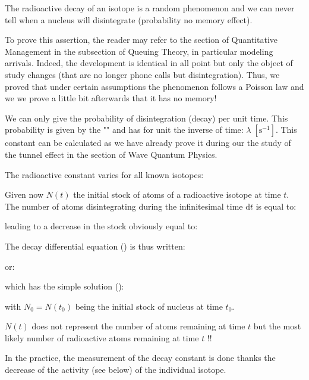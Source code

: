 	The radioactive decay of an isotope is a random phenomenon and we can never tell when a nucleus will disintegrate (probability no memory effect).
	
	\begin{tcolorbox}[title=Remark,colframe=black,arc=10pt]
	To prove this assertion, the reader may refer to the section of Quantitative Management in the subsection of Queuing Theory, in particular modeling arrivals. Indeed, the development is identical in all point but only the object of study changes (that are no longer phone calls but disintegration). Thus, we proved that under certain assumptions the phenomenon follows a Poisson law and we we prove a little bit afterwards that it has no memory!
	\end{tcolorbox}
	We can only give the probability of disintegration (decay) per unit time. This probability is given by the "" and has for unit the inverse of time: $\lambda\; [\text{s}^{-1}]$. This constant can be calculated as we have already prove it during our the study of the tunnel effect in the section of Wave Quantum Physics.

	The radioactive constant varies for all known isotopes:
	
	Given now $N (t)$ the initial stock of atoms of a radioactive isotope at time $t$. The number of atoms disintegrating during the infinitesimal time $\mathrm{d}t$ is equal to:
	
	leading to a decrease in the stock obviously equal to:
	
	The decay differential equation () is thus written:
	
	or:
	
	which has the simple solution ():
	
	with $N_0=N(t_0)$ being the initial stock of nucleus at time $t_0$. 
	
	\begin{tcolorbox}[title=Remark,colframe=black,arc=10pt]
	$N(t)$ does not represent the number of atoms remaining at time $t$ but the most likely number of radioactive atoms remaining at time $t$ !!
	\end{tcolorbox}
	
	In the practice, the measurement of the decay constant is done thanks the decrease of the activity (see below) of the individual isotope.
	
